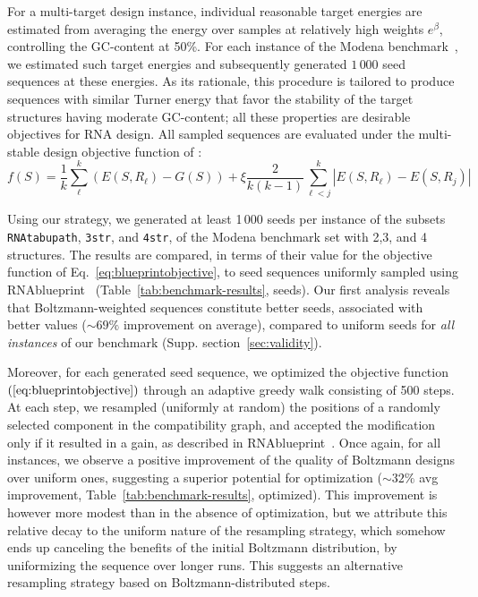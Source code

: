 \documentclass{bioinfo}
\newcommand{\Nuc}[1]{{\sf #1}}
\newcommand{\Cb}{\Nuc{C}}
\newcommand{\Gb}{\Nuc{G}}
\newcommand{\Software}[1]{{\ttfamily #1}}
\begin{document}
For a multi-target design instance, individual reasonable target energies are estimated from averaging the energy over samples at relatively high weights $e^{\beta}$, controlling the \Gb\Cb-content at 50\%. For each instance of the \Software{Modena} benchmark~\cite{Taneda2015}, we estimated such target energies and subsequently generated $1\,000$ seed sequences at these energies.
As its rationale, this procedure is tailored to produce sequences with similar Turner energy that favor the stability of the target structures having moderate \Gb\Cb-content; all these properties are desirable objectives for RNA design.
All sampled sequences are evaluated under the multi-stable design objective function of \cite{Hammer2017}:
\vspace{-12pt}
\begin{equation}
  \label{eq:blueprintobjective}
  f(S) = \frac{1}{k} \sum_\ell^{k} (E(S, R_\ell) - G(S))
   + \xi \frac{2}{k(k-1)} \sum\limits_{\ell<j}^k|E(S,R_\ell) - E(S,R_j)|
\end{equation}
\vspace{-12pt}

Using our strategy, we generated at least 1\,000 seeds per instance of the subsets \texttt{RNAtabupath}, \texttt{3str}, and \texttt{4str}, of the \Software{Modena} benchmark set
 with 2,3, and 4 structures. The results are compared, in terms of their value for the objective function of Eq.~\eqref{eq:blueprintobjective}, to seed sequences uniformly sampled using \Software{RNAblueprint}~\cite{Hammer2017}  (Table~\ref{tab:benchmark-results}, seeds). Our first analysis reveals that Boltzmann-weighted sequences constitute better seeds, associated with better values ($\sim 69\%$ improvement on average), compared to uniform seeds for \emph{all instances} of our benchmark (Supp. section~\ref{sec:validity}). 

Moreover, for each generated seed sequence, we optimized the objective function $(\ref{eq:blueprintobjective})$ through an adaptive  greedy walk consisting of 500 steps. At each step, we resampled (uniformly at random) the positions of a randomly selected component in the compatibility graph, and accepted the modification only if it resulted in a gain, as described in \Software{RNAblueprint}~\cite{Hammer2017}.
%
Once again, for all instances, we observe a positive improvement of the quality of Boltzmann designs over uniform ones, suggesting a superior potential for optimization ($\sim 32\%$ avg improvement, Table~\ref{tab:benchmark-results}, optimized). This improvement is however more modest than in the absence of optimization, but we attribute this relative decay to the uniform nature of the resampling strategy, which somehow ends up canceling the benefits of the initial Boltzmann distribution, by uniformizing the sequence over longer runs. This suggests an alternative resampling strategy based on Boltzmann-distributed steps.
\end{document}

